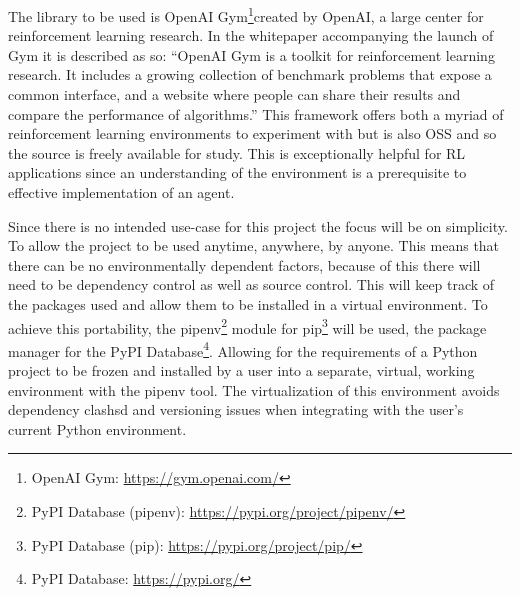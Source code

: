 \documentclass[hidelinks,journal]{IEEEtran}
\begin{document}
The library to be used is OpenAI Gym\footnote{OpenAI Gym: \url{https://gym.openai.com/}}created by OpenAI, a large center for reinforcement learning research. In the whitepaper accompanying the launch of Gym \textcite{Brockman16} it is described as so: “OpenAI Gym is a toolkit for reinforcement learning research.  It includes a growing collection of benchmark problems that expose a common interface, and a website where people can share their results and compare the performance of algorithms.” This framework offers both a myriad of reinforcement learning environments to experiment with but is also OSS and so the source is freely available for study. This is exceptionally helpful for RL applications since an understanding of the environment is a prerequisite to effective implementation of an agent.

Since there is no intended use-case for this project the focus will be on simplicity. To allow the project to be used anytime, anywhere, by anyone. This means that there can be no environmentally dependent factors, because of this  there will need to be dependency control as well as source control. This will keep track of the packages used and allow them to be installed in a virtual environment. To achieve this portability, the pipenv\footnote{PyPI Database (pipenv): \url{https://pypi.org/project/pipenv/}} module for pip\footnote{PyPI Database (pip): \url{https://pypi.org/project/pip/}} will be used, the package manager for the PyPI Database\footnote{PyPI Database: \url{https://pypi.org/}}. Allowing for the requirements of a Python project to be frozen and installed by a user into a separate, virtual, working environment with the pipenv tool. The virtualization of this environment avoids dependency clashsd and versioning issues when integrating with the user’s current Python environment.
\end{document}
